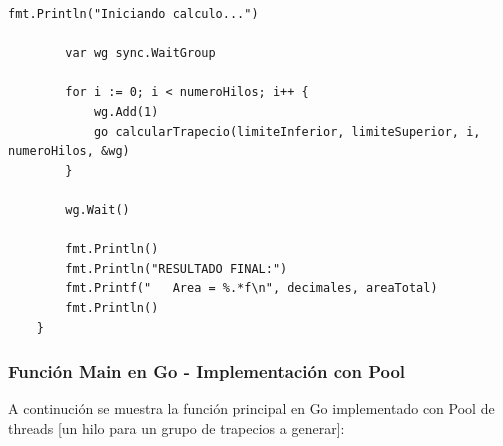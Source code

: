 \begin{lstlisting}[style=go-style, caption={Función Main en Golang}]
        fmt.Println("Iniciando calculo...")
        
        var wg sync.WaitGroup
        
        for i := 0; i < numeroHilos; i++ {
            wg.Add(1)
            go calcularTrapecio(limiteInferior, limiteSuperior, i, numeroHilos, &wg)
        }
        
        wg.Wait()
        
        fmt.Println()
        fmt.Println("RESULTADO FINAL:")
        fmt.Printf("   Area = %.*f\n", decimales, areaTotal)
        fmt.Println()
    }
\end{lstlisting}

\subsubsection {Función Main en Go - Implementación con Pool}

A continución se muestra la función principal en Go implementado con Pool de threads [un hilo para un grupo de trapecios a generar]:

